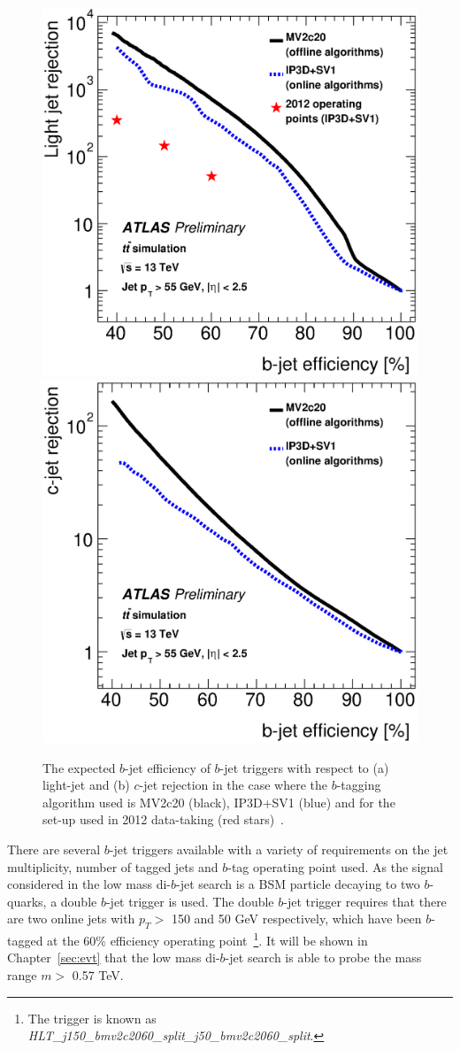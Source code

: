\begin{figure}[!ht]
  \begin{center}
    \includegraphics[width=0.48\linewidth, angle=0]{figs/Trigger/trig-bTrig_perf_light.eps}
    \includegraphics[width=0.48\linewidth, angle=0]{figs/Trigger/trig-bTrig_perf_charm.eps}
  \end{center}
  \caption[The expected $b$-jet efficiency of $b$-jet triggers in Run-2 compared to the set-up used in 2012 data-taking.]
    {The expected $b$-jet efficiency of $b$-jet triggers with respect to (a) light-jet and (b) $c$-jet rejection
    in the case where the $b$-tagging algorithm used is MV2c20 (black), IP3D+SV1 (blue) and for the set-up used in 2012 data-taking (red stars)~\cite{trig-bTrig_desc}.}
  \label{fig:trig-bTrig_perf}
\end{figure}


There are several $b$-jet triggers available
with a variety of requirements on the jet multiplicity, number of tagged jets and $b$-tag operating point used.
As the signal considered in the low mass di-$b$-jet search is a BSM particle decaying to two $b$-quarks, a double $b$-jet trigger is used.
The double $b$-jet trigger requires that there are two online jets with $p_T >$ 150 and 50 GeV respectively,
which have been $b$-tagged at the 60\% efficiency operating point~\footnote{The trigger is known as \textit{HLT\_j150\_bmv2c2060\_split\_j50\_bmv2c2060\_split}.}.
It will be shown in Chapter~\ref{sec:evt} that the low mass di-$b$-jet search is able to probe the mass range $m >$ 0.57 TeV.

